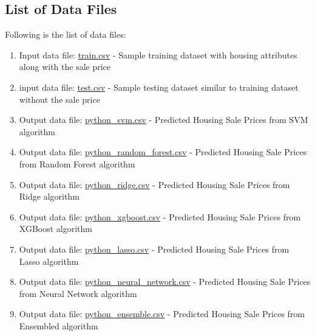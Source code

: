 \documentclass[sigconf]{acmart}
\begin{document}
     \subsection{List of Data Files}    
     Following is the list of data files:
    \begin{enumerate}        
    	\item Input data file: \href{https://github.com/bigdata-i523/hid306/blob/master/project/data/train.csv}{train.csv} - Sample training dataset with housing attributes along with the sale price
    	\item input data file: \href{https://github.com/bigdata-i523/hid306/blob/master/project/data/test.csv}{test.csv} - Sample testing dataset similar to training dataset without the sale price
    	
       	\item Output data file: \href{https://github.com/bigdata-i523/hid306/blob/master/project/data/kaggle_python_svm.csv}{python\_svm.csv} - Predicted Housing Sale Prices from SVM algorithm
       
		\item Output data file: \href{https://github.com/bigdata-i523/hid306/blob/master/project/data/kaggle_python_random_forest.csv}{python\_random\_forest.csv} - Predicted Housing Sale Prices from Random Forest algorithm
		
		\item Output data file: \href{https://github.com/bigdata-i523/hid306/blob/master/project/data/kaggle_python_ridge.csv}{python\_ridge.csv} - Predicted Housing Sale Prices from Ridge algorithm
		
		\item Output data file: \href{https://github.com/bigdata-i523/hid306/blob/master/project/data/kaggle_python_xgboost.csv}{python\_xgboost.csv} - Predicted Housing Sale Prices from XGBoost algorithm
		
		\item Output data file: \href{https://github.com/bigdata-i523/hid306/blob/master/project/data/kaggle_python_lasso.csv}{python\_lasso.csv} - Predicted Housing Sale Prices from Lasso algorithm
		
		\item Output data file: \href{https://github.com/bigdata-i523/hid306/blob/master/project/data/kaggle_python_neural_network.csv}{python\_neural\_network.csv} - Predicted Housing Sale Prices from Neural Network algorithm
		
		\item Output data file: \href{https://github.com/bigdata-i523/hid306/blob/master/project/data/kaggle_python_ensemble.csv}{python\_ensemble.csv} - Predicted Housing Sale Prices from Ensembled algorithm    	
	\end{enumerate}    
   
\end{document}
